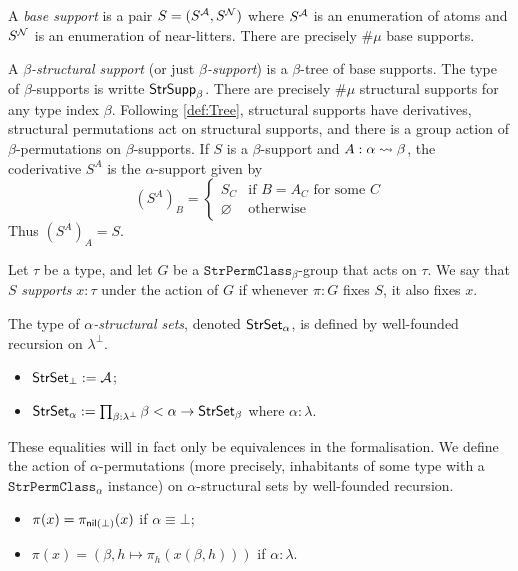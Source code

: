 \begin{definition}[support]
  \label{def:StrSupport}
  A \emph{base support} is a pair \( S = (S^{\mathcal A}, S^{\mathcal N}) \) where \( S^{\mathcal A} \) is an enumeration of atoms and \( S^{\mathcal N} \) is an enumeration of near-litters.
  There are precisely \( \#\mu \) base supports.

  A \emph{\( \beta \)-structural support} (or just \emph{\( \beta \)-support}) is a \( \beta \)-tree of base supports.
  The type of \( \beta \)-supports is writte \( \mathsf{StrSupp}_\beta \).
  There are precisely \( \#\mu \) structural supports for any type index \( \beta \).
  Following \cref{def:Tree}, structural supports have derivatives, structural permutations act on structural supports, and there is a group action of \( \beta \)-permutations on \( \beta \)-supports.
  If \( S \) is a \( \beta \)-support and \( A : \alpha \rightsquigarrow \beta \), the coderivative \( S^A \) is the \( \alpha \)-support given by
  \[ (S^A)_B = \begin{cases}
    S_C & \text{if } B = A_C \text{ for some } C \\
    \varnothing & \text{otherwise}
  \end{cases} \]
  Thus \( (S^A)_A = S \).

  Let \( \tau \) be a type, and let \( G \) be a \( \texttt{StrPermClass}_\beta \)-group that acts on \( \tau \).
  We say that \( S \) \emph{supports} \( x : \tau \) under the action of \( G \) if whenever \( \pi : G \) fixes \( S \), it also fixes \( x \).
\end{definition}
\begin{definition}
  \label{def:StrSet}
  The type of \emph{\( \alpha \)-structural sets}, denoted \( \mathsf{StrSet}_\alpha \), is defined by well-founded recursion on \( \lambda^\bot \).
  \begin{itemize}
    \item \( \mathsf{StrSet}_\bot := {\mathcal A} \);
    \item \( \mathsf{StrSet}_\alpha := \prod_{\beta : \lambda^\bot} \beta < \alpha \to \mathsf{StrSet}_\beta \) where \( \alpha : \lambda \).
  \end{itemize}
  These equalities will in fact only be equivalences in the formalisation.
  We define the action of \( \alpha \)-permutations (more precisely, inhabitants of some type with a \( \texttt{StrPermClass}_\alpha \) instance) on \( \alpha \)-structural sets by well-founded recursion.
  \begin{itemize}
    \item \( \pi(x) = \pi_{\operatorname{\mathsf{nil}}(\bot)}(x) \) if \( \alpha \equiv \bot \);
    \item \( \pi(x) = (\beta, h \mapsto \pi_h(x(\beta, h))) \) if \( \alpha : \lambda \).
  \end{itemize}
\end{definition}

